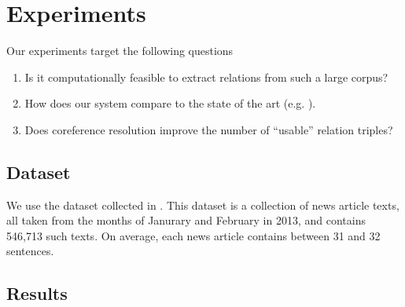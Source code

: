 \section{Experiments}

Our experiments target the following questions
\begin{enumerate}
\item Is it computationally feasible to extract relations from 
  such a large corpus?
\item How does our system compare to the state of the art (e.g. \reverb).
\item Does coreference resolution improve the number of 
  ``usable'' relation triples?
\end{enumerate}

\subsection{Dataset}
We use the \newsspike{} dataset collected in \citet{zhang2013parallelparaphrase}.
This dataset is a collection of news article texts, all taken from the months of
Janurary and February in 2013, and contains 546,713 such texts. On average,
each news article contains between 31 and 32 sentences.

\subsection{Results}



 





